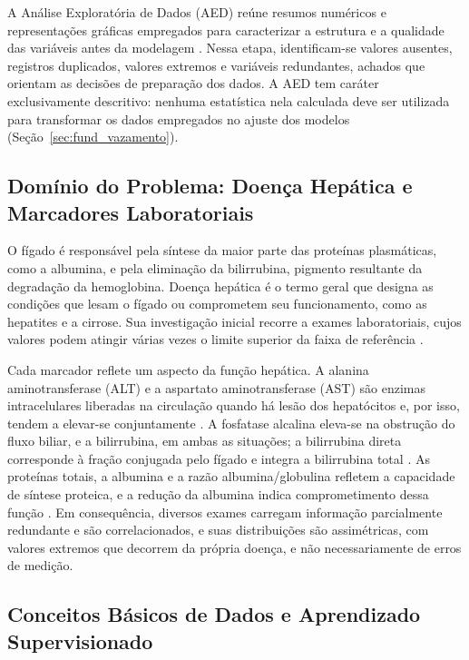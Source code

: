 A Análise Exploratória de Dados (AED) reúne resumos numéricos e representações gráficas empregados para caracterizar a estrutura e a qualidade das variáveis antes da modelagem \cite{exploratorydataanalysis}. Nessa etapa, identificam-se valores ausentes, registros duplicados, valores extremos e variáveis redundantes, achados que orientam as decisões de preparação dos dados. A AED tem caráter exclusivamente descritivo: nenhuma estatística nela calculada deve ser utilizada para transformar os dados empregados no ajuste dos modelos (Seção~\ref{sec:fund_vazamento}).

\subsection{Domínio do Problema: Doença Hepática e Marcadores Laboratoriais}
\label{sec:fund_figado}

O fígado é responsável pela síntese da maior parte das proteínas plasmáticas, como a albumina, e pela eliminação da bilirrubina, pigmento resultante da degradação da hemoglobina. Doença hepática é o termo geral que designa as condições que lesam o fígado ou comprometem seu funcionamento, como as hepatites e a cirrose. Sua investigação inicial recorre a exames laboratoriais, cujos valores podem atingir várias vezes o limite superior da faixa de referência \cite{Giannini2005Liver, Kwo2016ACG}.

Cada marcador reflete um aspecto da função hepática. A alanina aminotransferase (ALT) e a aspartato aminotransferase (AST) são enzimas intracelulares liberadas na circulação quando há lesão dos hepatócitos e, por isso, tendem a elevar-se conjuntamente \cite{Kwo2016ACG, Newsome2018Guidelines}. A fosfatase alcalina eleva-se na obstrução do fluxo biliar, e a bilirrubina, em ambas as situações; a bilirrubina direta corresponde à fração conjugada pelo fígado e integra a bilirrubina total \cite{Kwo2016ACG}. As proteínas totais, a albumina e a razão albumina/globulina refletem a capacidade de síntese proteica, e a redução da albumina indica comprometimento dessa função \cite{Busher1990Albumin}. Em consequência, diversos exames carregam informação parcialmente redundante e são correlacionados, e suas distribuições são assimétricas, com valores extremos que decorrem da própria doença, e não necessariamente de erros de medição.

\subsection{Conceitos Básicos de Dados e Aprendizado Supervisionado}
\label{sec:fund_conceitos}

